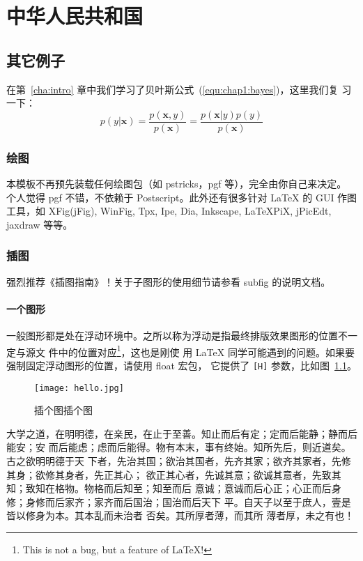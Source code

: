 \chapter{中华人民共和国}
\label{cha:china}

\section{其它例子}
\label{sec:other}

在第~\ref{cha:intro} 章中我们学习了贝叶斯公式~(\ref{equ:chap1:bayes})，这里我们复
习一下：
\begin{equation}
\label{equ:chap2:bayes}
p(y|\mathbf{x}) = \frac{p(\mathbf{x},y)}{p(\mathbf{x})}=
\frac{p(\mathbf{x}|y)p(y)}{p(\mathbf{x})}
\end{equation}

\subsection{绘图}
\label{sec:draw}

本模板不再预先装载任何绘图包（如 \textsf{pstricks，pgf} 等），完全由你自己来决定。
个人觉得 \textsf{pgf} 不错，不依赖于 Postscript。此外还有很多针对 \LaTeX{} 的
 GUI 作图工具，如 XFig(jFig), WinFig, Tpx, Ipe, Dia, Inkscape, LaTeXPiX,
jPicEdt, jaxdraw 等等。

\subsection{插图}
\label{sec:graphs}

强烈推荐《\LaTeXe 插图指南》！关于子图形的使用细节请参看 \textsf{subfig} 的说明文档。

\subsubsection{一个图形}
\label{sec:onefig}
一般图形都是处在浮动环境中。之所以称为浮动是指最终排版效果图形的位置不一定与源文
件中的位置对应\footnote{This is not a bug, but a feature of
\LaTeX!}，这也是刚使 用 \LaTeX{}
同学可能遇到的问题。如果要强制固定浮动图形的位置，请使用
\textsf{float} 宏包， 它提供了 \texttt{[H]}
参数，比如图~\ref{fig:heythere}。
\begin{figure}[H] %
  \centering
  \texttt{[image: hello.jpg]}
  \caption{插个图插个图}
  \label{fig:heythere}
\end{figure}

大学之道，在明明德，在亲民，在止于至善。知止而后有定；定而后能静；静而后能安；安
而后能虑；虑而后能得。物有本末，事有终始。知所先后，则近道矣。古之欲明明德于天
下者，先治其国；欲治其国者，先齐其家；欲齐其家者，先修其身；欲修其身者，先正其心；
欲正其心者，先诚其意；欲诚其意者，先致其知；致知在格物。物格而后知至；知至而后
意诚；意诚而后心正；心正而后身 修；身修而后家齐；家齐而后国治；国治而后天下
平。自天子以至于庶人，壹是皆以修身为本。其本乱而未治者 否矣。其所厚者薄，而其所
薄者厚，未之有也！

